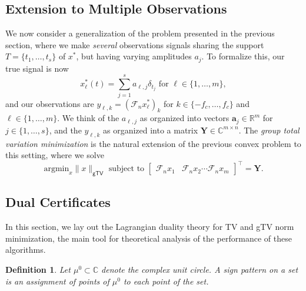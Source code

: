 \documentclass[11pt]{article}
\newcommand{\RR}{\mathbb{R}}
\newcommand{\CC}{\mathbb{C}}
\newcommand{\sF}{\mathcal{F}}
\newcommand{\argmin}{\mathrm{argmin}}
\newcommand{\bY}{\bm Y}
\newcommand{\ba}{\bm a}
\newtheorem{definition}{Definition}
\begin{document}
\subsection{Extension to Multiple Observations}

We now consider a generalization of the problem presented in the previous section, where we make \emph{several} observations signals sharing the support $T = \{t_1, \dots, t_s\}$ of $x^*$, but having varying amplitudes $a_j$.
To formalize this, our true signal is now
\begin{equation}
    x^*_\ell(t) = \sum_{j = 1}^s a_{\ell, j} \delta_{t_j} \text{ for } \ell \in \{1, \dots, m\},
\end{equation}
and our observations are $y_{\ell, k} = (\sF_n x^*_\ell)_{k}$ for $k \in \{-f_c, \dots, f_c\}$ and $\ell \in \{1, \dots, m\}$.
We think of the $a_{\ell, j}$ as organized into vectors $\ba_{j} \in \RR^m$ for $j \in \{1, \dots, s\}$, and the  $y_{\ell, k}$ as organized into a matrix $\bY \in \CC^{m \times n}$.
The \emph{group total variation minimization} is the natural extension of the previous convex problem to this setting, where we solve
\begin{equation}
    \argmin_x \|x\|_{\mathsf{gTV}} \text{ subject to } \left[\begin{array}{cccc}\sF_nx_1 & \sF_n x_2 \cdots \sF_n x_m \end{array}\right]^\top = \bY.
\end{equation}

\subsection{Dual Certificates}

In this section, we lay out the Lagrangian duality theory for TV and gTV norm minimization, the main tool for theoretical analysis of the performance of these algorithms.

\begin{definition}
    Let $\mu^0 \subset \CC$ denote the complex unit circle.
    A \emph{sign pattern} on a set is an assignment of points of $\mu^0$ to each point of the set.
\end{definition}
\end{document}
